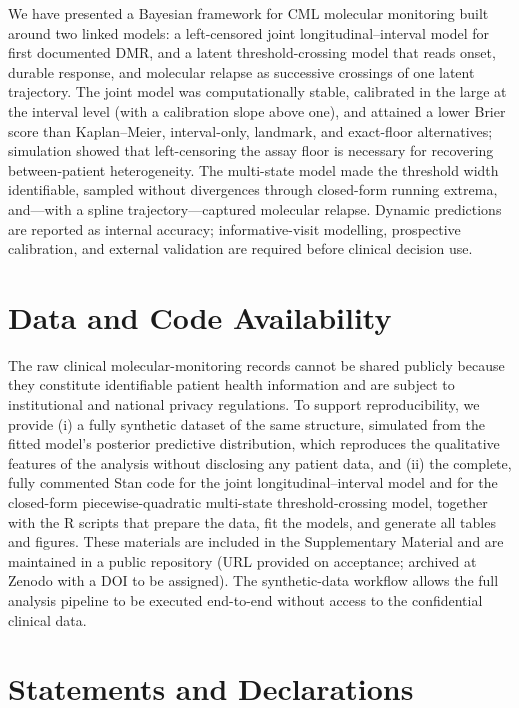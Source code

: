 \documentclass[11pt]{article}
\begin{document}
We have presented a Bayesian framework for CML molecular monitoring built
around two linked models: a left-censored joint longitudinal--interval model
for first documented DMR, and a latent threshold-crossing model that reads
onset, durable response, and molecular relapse as successive crossings of one
latent trajectory. The joint model was computationally stable, calibrated in the large at the
interval level (with a calibration slope above one), and attained a lower Brier
score than Kaplan--Meier, interval-only, landmark, and exact-floor
alternatives; simulation showed that left-censoring the assay floor is
necessary for recovering between-patient heterogeneity. The multi-state model
made the threshold width identifiable, sampled without divergences through
closed-form running extrema, and---with a spline trajectory---captured
molecular relapse. Dynamic predictions are reported as internal accuracy;
informative-visit modelling, prospective calibration, and external validation
are required before clinical decision use.

\section*{Data and Code Availability}

The raw clinical molecular-monitoring records cannot be shared publicly because
they constitute identifiable patient health information and are subject to
institutional and national privacy regulations. To support reproducibility, we
provide (i) a fully synthetic dataset of the same structure, simulated from the
fitted model's posterior predictive distribution, which reproduces the
qualitative features of the analysis without disclosing any patient data, and
(ii) the complete, fully commented Stan code for the joint
longitudinal--interval model and for the closed-form piecewise-quadratic
multi-state threshold-crossing model, together with the R scripts that prepare
the data, fit the models, and generate all tables and figures. These materials
are included in the Supplementary Material and are maintained in a public
repository (URL provided on acceptance; archived at Zenodo with a DOI to be
assigned). The synthetic-data workflow allows the full analysis pipeline to be
executed end-to-end without access to the confidential clinical data.

\section*{Statements and Declarations}
\end{document}
